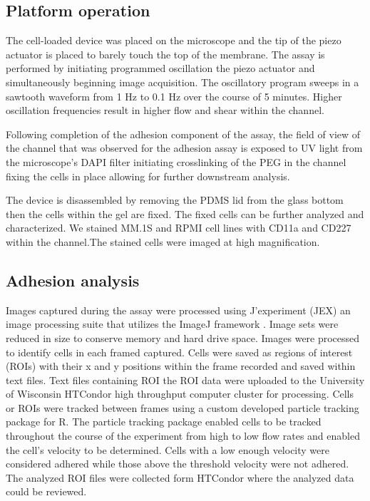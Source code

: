 \subsection{Platform operation}
The cell-loaded device was placed on the microscope and the tip of the piezo actuator is placed to barely touch the top of the membrane. The assay is performed by initiating programmed oscillation the piezo actuator and simultaneously beginning image acquisition. The oscillatory program sweeps in a sawtooth waveform from 1 Hz to 0.1 Hz over the course of 5 minutes. Higher oscillation frequencies result in higher flow and shear within the channel. 

Following completion of the adhesion component of the assay, the field of view of the channel that was observed for the adhesion assay is exposed to UV light from the microscope's DAPI filter initiating crosslinking of the PEG in the channel fixing the cells in place allowing for further downstream analysis. 

The device is disassembled by removing the PDMS lid from the glass bottom then the cells within the gel are fixed. The fixed cells can be further analyzed and characterized. We stained MM.1S and RPMI cell lines with CD11a and CD227 within the channel.The stained cells were imaged at high magnification. 


\subsection{Adhesion analysis}

Images captured during the assay were processed using J'experiment (JEX) an image processing suite that utilizes the ImageJ framework \cite{Warrick2016, Warrick2013}. Image sets were reduced in size to conserve memory and hard drive space. Images were processed to identify cells in each framed captured. Cells were saved as regions of interest (ROIs) with their x and y positions within the frame recorded and saved within text files. Text files containing ROI the ROI data were uploaded to the University of Wisconsin HTCondor high throughput computer cluster for processing. Cells or ROIs were tracked between frames using a custom developed particle tracking package for R. The particle tracking package enabled cells to be tracked throughout the course of the experiment from high to low flow rates and enabled the cell's velocity to be determined. Cells with a low enough velocity were considered adhered while those above the threshold velocity were not adhered. The analyzed ROI files were collected form HTCondor where the analyzed data could be reviewed. 

